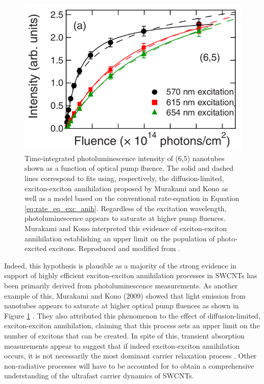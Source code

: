 \begin{figure}[ht]
	\centering
	\includegraphics[scale=1.7]{images/chapter_prior_works/murakami_pl_saturation}
	\caption{Time-integrated photoluminescence intensity of (6,5) nanotubes shown as a function of optical pump fluence. The solid and dashed lines correspond to fits using, respectively, the diffusion-limited, exciton-exciton annihilation proposed by Murakami and Kono as well as a model based on the conventional rate-equation in Equation \eqref{eq:rate_eq_exc_anih}. Regardless of the excitation wavelength, photoluminescence appears to saturate at higher pump fluences. Murakami and Kono interpreted this evidence of exciton-exciton annihilation establishing an upper limit on the population of photo-excited excitons. Reproduced and modified from \cite{murakami2009existence}. }
	\label{fig:pl_saturation_murakami}
\end{figure}

 Indeed, this hypothesis is plausible as a majority of the strong evidence in support of highly efficient exciton-exciton annihilation processes in SWCNTs has been primarily derived from photoluminescence measurements. As another example of this, Murakami and Kono (2009) showed that light emission from nanotubes appears to saturate at higher optical pump fluences as shown in Figure \ref{fig:pl_saturation_murakami} \cite{murakami2009existence}. They also attributed this phenomenon to the effect of diffusion-limited, exciton-exciton annihilation, claiming that this process sets an upper limit on the number of excitons that can be created. In spite of this, transient absorption measurements appear to suggest that if indeed exciton-exciton annihilation occurs, it is not necessarily the most dominant carrier relaxation process \cite{ostojic2004interband, manzoni2005intersubband, luer2009size}. Other non-radiative processes will have to be accounted for to obtain a comprehensive understanding of the ultrafast carrier dynamics of SWCNTs.




